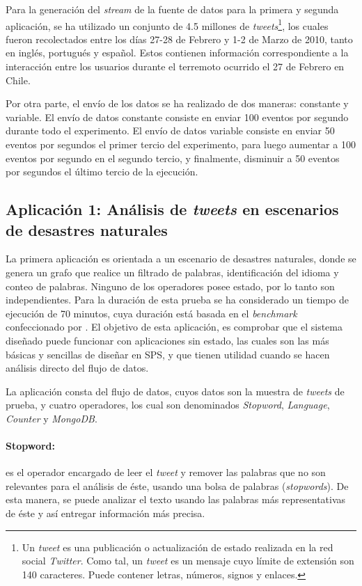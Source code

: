 Para la generación del \textit{stream} de la fuente de datos para la primera y segunda aplicación, se ha utilizado un conjunto de 4.5 millones de \textit{tweets}\footnote{Un \textit{tweet} es una publicación o actualización de estado realizada en la red social \textit{Twitter}. Como tal, un \textit{tweet} es un mensaje cuyo límite de extensión son 140 caracteres. Puede contener letras, números, signos y enlaces.}, los cuales fueron recolectados entre los días 27-28 de Febrero y 1-2 de Marzo de 2010, tanto en inglés, portugués y español. Estos contienen información correspondiente a la interacción entre los usuarios durante el terremoto ocurrido el 27 de Febrero en Chile.

Por otra parte, el envío de los datos se ha realizado de dos maneras: constante y variable. El envío de datos constante consiste en enviar 100 eventos por segundo durante todo el experimento. El envío de datos variable consiste en enviar 50 eventos por segundos el primer tercio del experimento, para luego aumentar a 100 eventos por segundo en el segundo tercio, y finalmente, disminuir a 50 eventos por segundos el último tercio de la ejecución.

\subsection{Aplicación 1: Análisis de \textit{tweets} en escenarios de desastres naturales}
La primera aplicación es orientada a un escenario de desastres naturales, donde se genera un grafo que realice un filtrado de palabras, identificación del idioma y conteo de palabras. Ninguno de los operadores posee estado, por lo tanto son independientes. Para la duración de esta prueba se ha considerado un tiempo de ejecución de 70 minutos, \normalsize{cuya duración está basada en el \textit{benchmark} confeccionado por} \citep{ArasuCGMMRST04}. El objetivo de esta aplicación, es comprobar que el sistema diseñado puede funcionar con aplicaciones sin estado, las cuales son las más básicas y sencillas de diseñar en SPS, y que tienen utilidad cuando se hacen análisis directo del flujo de datos.

La aplicación consta del flujo de datos, cuyos datos son la muestra de \textit{tweets} de prueba, y cuatro operadores, los cual son denominados \textit{Stopword}, \textit{Language}, \textit{Counter} y \textit{MongoDB}.

\paragraph{Stopword:} es el operador encargado de leer el \textit{tweet} y remover las palabras que no son relevantes para el análisis de éste, usando una bolsa de palabras (\textit{stopwords}). De esta manera, se puede analizar el texto usando las palabras más representativas de éste y así entregar información más precisa.

